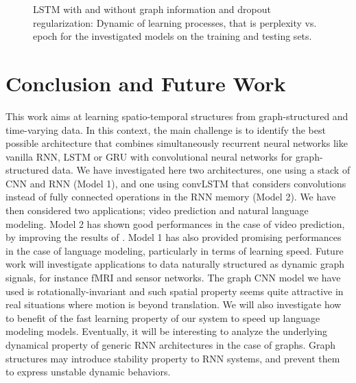 \documentclass{article} %
\begin{document}
\begin{figure}[h!]
	\centering
	\hfill
	\caption{LSTM with and without graph information and dropout regularization: Dynamic of learning processes, that is perplexity vs. epoch for the investigated models on the training and testing sets.}
	\label{fig3}
\end{figure}







\section{Conclusion and Future Work}

This work aims at learning spatio-temporal structures from graph-structured and time-varying data. In this context, the main challenge is to identify the best possible architecture that combines simultaneously recurrent neural networks like vanilla RNN, LSTM or GRU with convolutional neural networks for graph-structured data. We have investigated here two architectures, one using a stack of CNN and RNN (Model 1), and one using convLSTM that considers convolutions instead of fully connected operations in the RNN memory (Model 2). We have then considered two applications; video prediction and natural language modeling. Model 2 has shown good performances in the case of video prediction, by improving the results of \citet{convlstm}. Model 1 has also provided promising performances in the case of language modeling, particularly in terms of learning speed. Future work will investigate applications to data naturally structured as dynamic graph signals, for instance fMRI and sensor networks. The graph CNN model we have used is rotationally-invariant and such spatial property seems quite attractive in real situations where motion is beyond translation. We will also investigate how to benefit of the fast learning property of our system to speed up language modeling models. Eventually, it will be interesting to analyze the underlying dynamical property of generic RNN architectures in the case of graphs. Graph structures may introduce stability property to RNN systems, and prevent them to express unstable dynamic behaviors.
\end{document}
